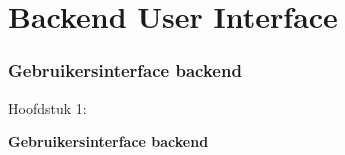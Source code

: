 %

\section{Backend User Interface}
\begin{frame}[fragile]
	\frametitle{Gebruikersinterface backend}

	\begin{center}\huge{Hoofdstuk 1:}\end{center}
	\begin{center}\huge{\color{typo3darkgrey}\textbf{Gebruikersinterface backend}}\end{center}

\end{frame}

